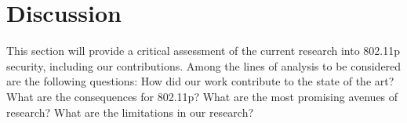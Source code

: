 \documentclass[conference]{IEEEtran}
\begin{document}
\section{Discussion}
This section will provide a critical assessment of the current research into 802.11p security, including our contributions. Among the lines of analysis to be considered are the following questions: How did our work contribute to the state of the art? What are the consequences for 802.11p? What are the most promising avenues of research? What are the limitations in our research?



\end{document}
